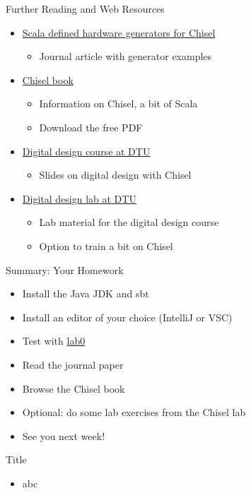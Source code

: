 \begin{frame}[fragile]{Further Reading and Web Resources}
\begin{itemize}
\item \href{https://www.sciencedirect.com/science/article/pii/S014193312500050X}{Scala defined hardware generators for Chisel}
\begin{itemize}
\item Journal article with generator examples
\end{itemize}
\item \href{http://www.imm.dtu.dk/~masca/chisel-book.html}{Chisel book}
\begin{itemize}
\item Information on Chisel, a bit of Scala
\item Download the free PDF
\end{itemize}
\item \href{http://www2.imm.dtu.dk/courses/02139/}{Digital design course at DTU}
\begin{itemize}
\item Slides on digital design with Chisel
\end{itemize}
\item \href{https://github.com/schoeberl/chisel-lab}{Digital design lab at DTU}
\begin{itemize}
\item Lab material for the digital design course
\item Option to train a bit on Chisel
\end{itemize}
\end{itemize}
\end{frame}

\begin{frame}[fragile]{Summary: Your Homework}
\begin{itemize}
\item Install the Java JDK and sbt
\item Install an editor of your choice (IntelliJ or VSC)
\item Test with \href{https://github.com/schoeberl/agile-hw/tree/main/lab0}{lab0}
\item Read the journal paper
\item Browse the Chisel book
\item Optional: do some lab exercises from the Chisel lab
\item See you next week!
\end{itemize}
\end{frame}




\begin{frame}[fragile]{Title}
\begin{itemize}
\item abc
\end{itemize}
\end{frame}
